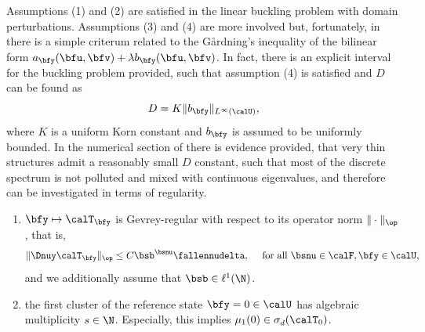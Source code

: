 Assumptions (1) and (2) are satisfied in the linear buckling problem with domain perturbations. Assumptions (3) and (4) are more involved but, fortunately, in \cite[Theorem 4.2]{DaugeandSuriNumericalapproximation}  there is a simple criterum related to the Gårdning's inequality of the bilinear form $a_\bfy(\bfu,\bfv) + \lambda b_\bfy(\bfu,\bfv)$. In fact, there is an explicit interval for the buckling problem provided, such that assumption (4) is satisfied and $D$ can be found as 
\begin{equation*}
    D= K \| b_\bfy \|_{L^\infty(\calU)},
\end{equation*}  where $K$ is a uniform Korn constant and $b_\bfy$ is assumed to be uniformly bounded.
In the numerical section of \cite{DaugeandSuriNumericalapproximation} there is evidence provided, that very thin structures admit a reasonably small $D$ constant, such that most of the discrete spectrum is not polluted and mixed with continuous eigenvalues, and therefore can be investigated in terms of regularity.



\begin{assumption}
    \begin{enumerate}
        \item[(1)] $ \bfy \mapsto \calT_\bfy$ is Gevrey-regular with respect to its operator norm $\|\cdot \|_{\op}$, that is,
        \begin{equation}
            \| \Dnuy \calT_\bfy \|_{\op} \leq C \bsb^{\bsnu} \fallennudelta, \quad  \text{ for all } \bsnu \in \calF, \bfy \in \calU,
         \end{equation}
        and we additionally assume that $\bsb \in \ell^1(\N)$.
        \item[(2)] the first cluster of the reference state $\bfy= 0 \in \calU$ has algebraic multiplicity $s \in \N$. Especially, this implies $\mu_1(0) \in \sigma_{\mathop{d}}(\calT_0)$.
    \end{enumerate}
\end{assumption}




